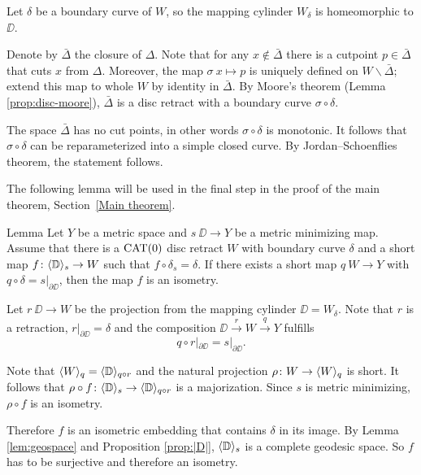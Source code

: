 Let $\delta$ be a boundary curve of $W$, so the mapping cylinder $W_\delta$ is homeomorphic to $\DD$.

Denote by $\bar\Delta$ the closure of $\Delta$.
Note that for any $x\notin\bar\Delta$ there is a cutpoint $p\in\bar\Delta$ that cuts $x$ from $\Delta$.
Moreover, the map $\sigma\:x\mapsto p$ is uniquely defined on $W\backslash\bar\Delta$;
extend this map to whole $W$ by identity in $\bar\Delta$.
By Moore's theorem (Lemma \ref{prop:disc-moore}), $\bar\Delta$ is a disc retract with a boundary curve $\sigma\circ\delta$.

The space $\bar\Delta$ has no cut points, in other words $\sigma\circ\delta$ is monotonic.
It follows that $\sigma\circ\delta$ can be reparameterized into a simple closed curve.
By Jordan--Schoenflies theorem, the statement follows.
\qeds

The following lemma will be used in the final step in the proof of the main theorem, Section~\ref{Main theorem}.

\begin{thm}{Lemma}\label{lem:maj is isom}
Let $Y$ be a metric space and $s\:\DD\to Y$ be a metric minimizing map.
Assume that there is a $\mathop{\rm CAT}\nolimits(0)$ disc retract $W$ with boundary curve $\delta$ and a short map $f\colon\langle\mathbb{D}\rangle_s \to W$
such that $f\circ \delta_s=\delta$. If there exists a short map 
$q\: W\to Y$ with $q\circ \delta=s|_{\partial \DD}$, then the map $f$ is an isometry.
\end{thm}

Let $r\:\DD\to W$ be the projection from the mapping cylinder $\DD=W_\delta$. 
Note that $r$ is a retraction, $r|_{\partial \DD}=\delta$ and the composition $\DD\xrightarrow{r}W\xrightarrow{q} Y$ fulfills \[q\circ r|_{\partial \DD}=s|_{\partial \DD}.\]

Note that  $\langle W\rangle_q=\langle\mathbb{D}\rangle_{q\circ r}$ and the natural projection $\rho\colon W\to \langle W\rangle_q$ is short.
It follows that $\rho\circ f\colon \langle\mathbb{D}\rangle_s\to \langle\mathbb{D}\rangle_{q\circ r}$ is a majorization.
Since $s$ is metric minimizing, $\rho\circ f$ is an isometry. 

Therefore $f$ is an isometric embedding that contains $\delta$
in its image. 
By Lemma \ref{lem:geospace} and Proposition \ref{prop:|D|}, $\langle\mathbb{D}\rangle_s$ is a complete geodesic space.
So $f$ has to be surjective and therefore an isometry.
\qeds
